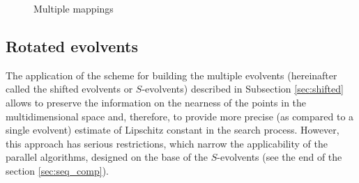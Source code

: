 \documentclass[runningheads]{llncs}
\begin{document}
\begin{figure}[ht]
    \centering
    \caption{Multiple mappings}
\end{figure}

\subsection{Rotated evolvents}
The application of the scheme for building the multiple evolvents (hereinafter called the shifted
evolvents or $S$-evolvents) described in Subsection \ref{sec:shifted} allows to preserve the
information on the nearness of the points in the multidimensional space and, therefore, to
provide more precise (as compared to a single evolvent) estimate of Lipschitz constant in the
search process. However, this approach has serious restrictions, which narrow the applicability
of the parallel algorithms, designed on the base of the $S$-evolvents (see the end of the section
\ref{sec:seq_comp}).
\end{document}
